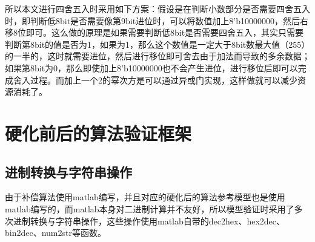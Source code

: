 所以本文进行四舍五入时采用如下方案：假设是在判断小数部分是否需要四舍五入时，即判断低8bit是否需要像第9bit进位时，可以将数值加上8'b10000000，然后右移8位即可。这么做的原理是如果需要判断低8bit是否需要四舍五入，其实只需要判断第8bit的值是否为1，如果为1，那么这个数值是一定大于8bit数最大值（255）的一半的，这时就需要进位，然后进行移位即可舍去由于加法而导致的多余数据；如果第8bit为0，那么即使加上8'b10000000也不会产生进位，进行移位后即可以完成舍入过程。而加上一个2的幂次方是可以通过异或门实现，这样做就可以减少资源消耗了。

\section{硬化前后的算法验证框架}
\subsection{进制转换与字符串操作}
由于补偿算法使用matlab编写，并且对应的硬化后的算法参考模型也是使用matlab编写的，而matlab本身对二进制计算并不友好，所以模型验证时采用了多次进制转换与字符串操作，这些操作使用matlab自带的dec2hex、hex2dec、bin2dec、num2str等函数。

